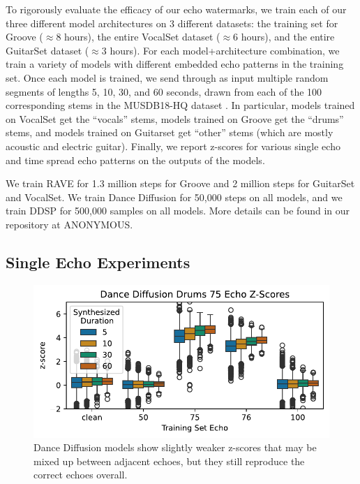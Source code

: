\documentclass[letterpaper]{article} %
\begin{document}
To rigorously evaluate the efficacy of our echo watermarks, we train each of our three different model architectures on 3 different datasets:  the training set for Groove \cite{groove2019} ($\approx$8 hours), the entire VocalSet dataset \cite{wilkins2018vocalset} ($\approx$6 hours), and the entire GuitarSet dataset \cite{xi2018guitarset} ($\approx$3 hours).  For each model+architecture combination, we train a variety of models with different embedded echo patterns in the training set.  Once each model is trained, we send through as input multiple random segments of lengths 5, 10, 30, and 60 seconds, drawn from each of the 100 corresponding stems in the MUSDB18-HQ dataset \cite{musdb18-hq}.  In particular, models trained on VocalSet get the ``vocals'' stems, models trained on Groove get the ``drums'' stems, and models trained on Guitarset get ``other'' stems (which are mostly acoustic and electric guitar).  Finally, we report z-scores for various single echo and time spread echo patterns on the outputs of the models.

We train RAVE for 1.3 million steps for Groove and 2 million steps for GuitarSet and VocalSet.  We train Dance Diffusion for 50,000 steps on all models, and we train DDSP for 500,000 samples on all models.  More details can be found in our repository at ANONYMOUS.  

\subsection{Single Echo Experiments}
\label{sec:experimentssingleecho}

\begin{figure}
    \centering
    \includegraphics[width=\columnwidth]{figs/DanceDiffusionZScoreExamples.pdf}
    \caption{Dance Diffusion models show slightly weaker z-scores that may be mixed up between adjacent echoes, but they still reproduce the correct echoes overall.}
    \label{fig:dancediffusionzscoreexamples}
\end{figure}
\end{document}
